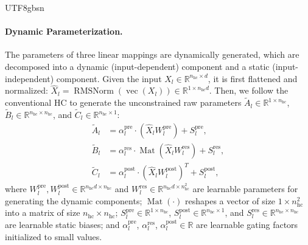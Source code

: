 \documentclass[11pt, a4paper, logo, copyright, nonumbering]{deepseek}
\begin{document}
\begin{CJK*}{UTF8}{gbsn}
\paragraph{Dynamic Parameterization.}
The parameters of three linear mappings are dynamically generated, which are decomposed into a dynamic (input-dependent) component and a static (input-independent) component. 
Given the input $X_l \in \mathbb{R}^{n_{\text{hc}} \times d}$, it is first flattened and normalized: $\hat{X}_l = \operatorname{RMSNorm}(\operatorname{vec}(X_l)) \in \mathbb{R}^{1 \times n_{\text{hc}}d}$. 
Then, we follow the conventional HC to generate the unconstrained raw parameters $\tilde{A}_l \in \mathbb{R}^{1 \times n_{\text{hc}}}$, $\tilde{B}_l \in \mathbb{R}^{n_{\text{hc}} \times n_{\text{hc}}}$, and $\tilde{C}_l \in \mathbb{R}^{n_{\text{hc}} \times 1}$:
\begin{align}
    \tilde{A}_l &= \alpha_l^\mathrm{pre} \cdot (\hat{X}_l W^\mathrm{pre}_l) + S_l^\mathrm{pre}, \\
    \tilde{B}_l &= \alpha_l^\mathrm{res} \cdot \operatorname{Mat}(\hat{X}_l W^\mathrm{res}_l) + S_l^\mathrm{res}, \\
    \tilde{C}_l &= \alpha_l^\mathrm{post} \cdot (\hat{X}_l W^\mathrm{post}_l)^T + S_l^\mathrm{post},
\end{align}
where $W^\mathrm{pre}_l, W^\mathrm{post}_l \in \mathbb{R}^{n_{\text{hc}}d \times n_{\text{hc}}}$ and $W^\mathrm{res}_l \in \mathbb{R}^{n_{\text{hc}}d \times n_{\text{hc}}^2}$ are learnable parameters for generating the dynamic components;
$\operatorname{Mat}(\cdot)$ reshapes a vector of size $1 \times n_{\text{hc}}^2$ into a matrix of size $n_{\text{hc}} \times n_{\text{hc}}$; 
$S_l^\mathrm{pre} \in \mathbb{R}^{1 \times n_{\text{hc}}}$, $S_l^\mathrm{post} \in \mathbb{R}^{n_{\text{hc}}\times 1}$, and $S_l^\mathrm{res} \in \mathbb{R}^{n_{\text{hc}} \times n_{\text{hc}}}$ are learnable static biases; 
and $\alpha_l^\mathrm{pre}$, $\alpha_l^\mathrm{res}$, $\alpha_l^\mathrm{post} \in \mathbb{R}$ are learnable gating factors initialized to small values. 


\end{CJK*}
\end{document}
